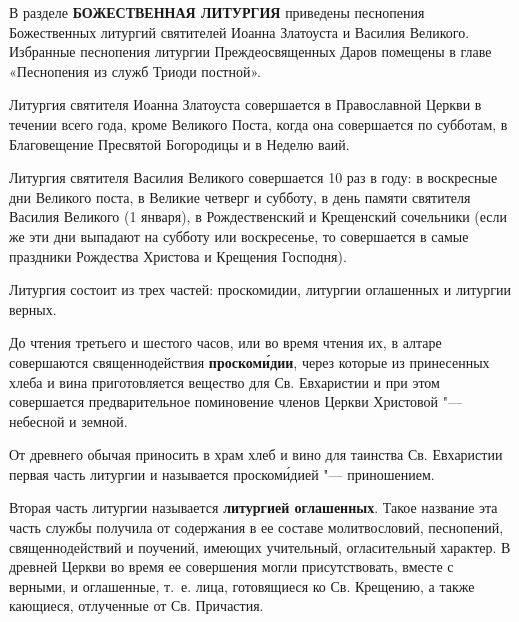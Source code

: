 

\label{_content_Liturgiya}


В разделе \textbf{БОЖЕСТВЕННАЯ ЛИТУРГИЯ} приведены песнопения Божественных литургий святителей Иоанна Златоуста и Василия Великого. Избранные песнопения литургии Преждеосвященных Даров помещены в главе «Песнопения из служб Триоди постной».

Литургия святителя Иоанна Златоуста совершается в Православной Церкви в течении всего года, кроме Великого Поста, когда она совершается по субботам, в Благовещение Пресвятой Богородицы и в Неделю ваий.

Литургия святителя Василия Великого совершается 10 раз в году: в воскресные дни Великого поста, в Великие четверг и субботу, в день памяти святителя Василия Великого (1 января), в Рождественский и Крещенский сочельники (если же эти дни выпадают на субботу или воскресенье, то совершается в самые праздники Рождества Христова и Крещения Господня).

Литургия состоит из трех частей: проскомидии, литургии оглашенных и литургии верных.


До чтения третьего и шестого часов, или во время чтения их, в алтаре совершаются священнодействия \textbf{проском\'{и}дии}, через которые из принесенных хлеба и вина приготовляется вещество для Св. Евхаристии и при этом совершается предварительное поминовение членов Церкви Христовой "--- небесной и земной.

От древнего обычая приносить в храм хлеб и вино для таинства Св. Евхаристии первая часть литургии и называется проском\'{и}дией "--- приношением.

\mychapterending


Вторая часть литургии называется \textbf{литургией оглашенных}. Такое название эта часть службы получила от содержания в ее составе молитвословий, песнопений, священнодействий и поучений, имеющих учительный, огласительный характер. В древней Церкви во время ее совершения могли присутствовать, вместе с верными, и оглашенные, т.~е. лица, готовящиеся ко Св. Крещению, а также кающиеся, отлученные от Св. Причастия.

